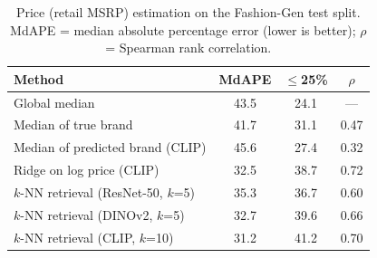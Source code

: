 \begin{table}[t]\centering\small
\caption{Price (retail MSRP) estimation on the Fashion-Gen test split. MdAPE = median absolute percentage error (lower is better); $\rho$ = Spearman rank correlation.}\label{tab:price}
\setlength{\tabcolsep}{3pt}\begin{tabular}{lccc}\toprule
Method & MdAPE & $\leq$25\% & $\rho$ \\\midrule
Global median & 43.5 & 24.1 & --- \\
Median of true brand & 41.7 & 31.1 & 0.47 \\
Median of predicted brand (CLIP) & 45.6 & 27.4 & 0.32 \\
Ridge on log price (CLIP) & 32.5 & 38.7 & 0.72 \\
$k$-NN retrieval (ResNet-50, $k$=5) & 35.3 & 36.7 & 0.60 \\
$k$-NN retrieval (DINOv2, $k$=5) & 32.7 & 39.6 & 0.66 \\
$k$-NN retrieval (CLIP, $k$=10) & 31.2 & 41.2 & 0.70 \\
\bottomrule\end{tabular}\end{table}

